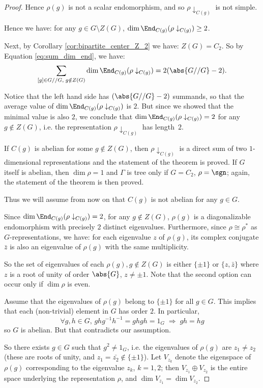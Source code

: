 \begin{proof}
Hence $\rho(g)$ is not a scalar endomorphism, and so $\rho \downarrow_{C(g)}$ is not simple.
 
Hence we have: for any $g\in G \setminus Z(G)$, $\dim \End_{C(g)}(\rho \downarrow_{C(g)}) \geq 2$. 
 
 
 Next, by Corollary \ref{cor:bipartite_center_Z_2} we have: $Z(G) = C_2$. So by Equation \eqref{eq:sum_dim_end}, we have:
 $$\sum_{\substack{[g] \in G//G,\; g \notin Z(G)}} \dim \End_{C(g)}(\rho \downarrow_{C(g)}) = 2(\abs{G//G} -2).$$
 
 Notice that the left hand side has $(\abs{G//G} -2)$ summands, so that the average value of $\dim \End_{C(g)}(\rho \downarrow_{C(g)}) $ is $2$. But since we showed that the minimal value is also $2$, we conclude that $\dim \End_{C(g)}(\rho \downarrow_{C(g)}) =2$ for any $g\notin Z(G)$, i.e. the representation $\rho \downarrow_{C(g)}$ has length~$2$.
 
 If $C(g)$ is abelian for some $g\notin Z(G)$, then $\rho \downarrow_{C(g)}$ is a direct sum of two $1$-dimensional representations and the statement of the theorem is proved. If $G$ itself is abelian, then $\dim \rho = 1$ and $\Gamma$ is tree only if $G= C_2$, $\rho = \sgn$; again, the statement of the theorem is then proved. 
 
Thus we will assume from now on that $C(g)$ is not abelian for any $g\in G$.
 
Since $\dim \End_{C(g)}(\rho \downarrow_{C(g)}) =2$, for any $g\notin Z(G)$, $\rho(g)$ is a diagonalizable endomorphism with precisely $2$ distinct eigenvalues. Furthermore, since $\rho \cong \rho^*$ as $G$-representations, we have: for each eigenvalue $z$ of $\rho(g)$, its complex conjugate $\bar{z}$ is also an eigenvalue of $\rho(g)$ with the same multiplicity. 

So the set of eigenvalues of each $\rho(g), g\notin Z(G)$ is either $\{\pm 1\}$ or $\{z, \bar{z}\}$ where $z$ is a root of unity of order $\abs{G}$, $z\neq \pm 1$. Note that the second option can occur only if $\dim \rho$ is even.

Assume {that the eigenvalues of $\rho(g)$ belong to $\{\pm 1\}$ for all $g\in G$}. This implies that each {(non-trivial)} element in $G$ has order $2$. In particular, $$\forall g, h\in G, \, ghg^{-1}h^{-1} = ghgh=1_G \; \Rightarrow \; gh=hg$$ so $G$ is abelian. But that contradicts our assumption. 

So there exists $g \in G$ such that $g^2 \neq 1_G$, i.e. the eigenvalues of $\rho(g)$ are $z_1 \neq z_2$ (these are roots of unity, and $z_1 =\bar{z_2} { \notin \{\pm 1\}}$). Let $V_{z_k}$ denote the eigenspace of $\rho(g)$ corresponding to the eigenvalue $z_k$, $k=1,2$; then $V_{z_1} \oplus V_{z_2}$ is the entire space underlying the representation $\rho$, and $\dim V_{z_1} = \dim V_{z_2}$. 


\end{proof}
